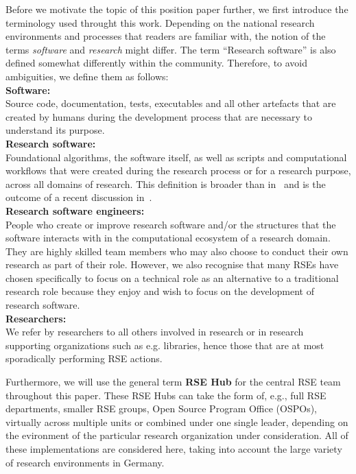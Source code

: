 \documentclass[a4paper]{article}
\makeatletter
\newcommand*{\eg}{e.g.\@\xspace}
\makeatother
\begin{document}
Before we motivate the topic of this position paper further, we first introduce the terminology used throught this work.
Depending on the national research
environments and processes that readers are familiar with, the notion of the terms \emph{software} and \emph{research} might differ.
The term “Research software” is also defined somewhat differently within the community.
Therefore, to avoid ambiguities, we define them as follows:\\
\textbf{Software:}\\
Source code, documentation, tests, executables
and all other artefacts that are created by humans during the development process
that are necessary to understand its purpose.\\
\textbf{Research software:}\\
Foundational algorithms, the software itself,
as well as scripts and computational workflows that were created
during the research process or for a research purpose, across all domains of research.
This definition is broader than in~\autocite{FAIR4RS} and is the outcome of a recent
discussion in~\autocite{Gruenpeter2021}.\\
\textbf{Research software engineers:}\\
People who
create or improve research software and/or the structures that the software interacts with
in the computational ecosystem of a research domain.
They are highly skilled team members who may also choose to conduct their own research as
part of their role.
However, we also recognise that many RSEs have chosen specifically to focus on a technical
role as an alternative to a traditional research role because they enjoy and wish to focus
on the development of research software.\\
\textbf{Researchers:}\\
We refer by researchers to all others involved in research or in research supporting organizations such as \eg libraries,
hence those that are at most sporadically performing RSE actions.

Furthermore, we will use the general term \textbf{RSE Hub} for the central RSE team throughout this paper. 
These RSE Hubs can take the form of, e.g., full RSE departments, smaller RSE groups, Open Source Program Office (OSPOs), virtually across multiple units or combined under one single leader, depending on the evironment of the particular research organization under consideration.
All of these implementations are considered here, taking into account the large variety of research environments in Germany.
\end{document}

